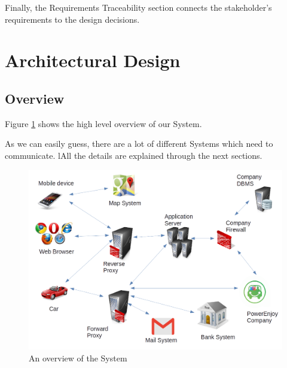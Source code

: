 \documentclass[12pt]{article}
\begin{document}
Finally, the Requirements Traceability section connects the stakeholder's requirements to the design decisions.

\clearpage
\section{Architectural Design}
\subsection{Overview}
Figure \ref{fig:overview} shows the high level overview of our System. 

As we can easily guess, there are a lot of different Systems which need to communicate. lAll the details are explained through the next sections.

\begin{figure}[h]
	\centering
	\includegraphics[width=\textwidth]{../Images/Overview}
	\caption{An overview of the System}
	\label{fig:overview}
\end{figure}
\end{document}
